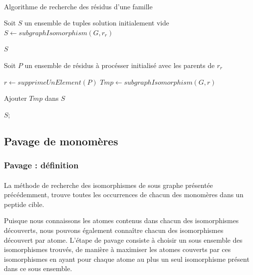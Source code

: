 \documentclass[12pt,french,twoside]{report}
\begin{document}
\paragraph{}
\begin{algorithm}[H]
  \caption{Algorithme de recherche des résidus d'une famille}
  Soit $S$ un ensemble de tuples solution initialement vide\;
  $S \gets subgraphIsomorphism (G, r_r)$\;
  
   {
    \KwRet $S$\;
  }
  
  Soit $P$ un ensemble de résidus à procésser initialisé avec les parents de $r_r$\;
   {
    $r \gets supprimeUnElement(P)$\;
    $Tmp \gets subgraphIsomorphism (G, r)$\;
    
     {
      Ajouter $Tmp$ dans $S$\;
    }
  }
  
  \KwRet $S$;
\end{algorithm}




\subsection{Pavage de monomères}

\subsubsection{Pavage : définition}

\paragraph{}La méthode de recherche des isomorphismes de sous graphe présentée précédemment, trouve toutes les occurrences de chacun des monomères dans un peptide cible.

Puisque nous connaissons les atomes contenus dans chacun des isomorphismes découverts, nous pouvons également connaître chacun des
isomorphismes découvert par atome.
L'étape de pavage consiste à choisir un sous ensemble des isomorphismes trouvés, de manière à maximiser les atomes couverts par ces
isomorphismes en ayant pour chaque atome au plus un seul isomorphisme présent dans ce sous ensemble.
\end{document}
